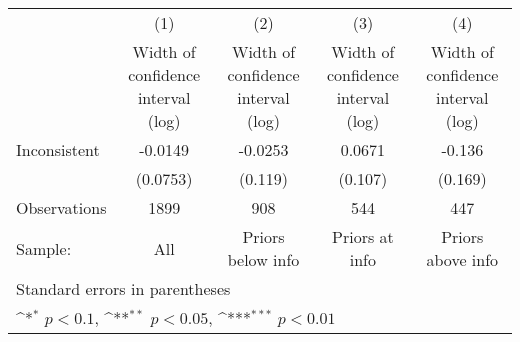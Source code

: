 {
\def\sym#1{\ifmmode^{#1}\else\(^{#1}\)\fi}
\begin{tabular}{l*{4}{c}}
\hline\hline
                    &\multicolumn{1}{c}{(1)}         &\multicolumn{1}{c}{(2)}         &\multicolumn{1}{c}{(3)}         &\multicolumn{1}{c}{(4)}         \\
                    &\shortstack{Width of \\ confidence interval \\ (log)}         &\shortstack{Width of \\ confidence interval \\ (log)}         &\shortstack{Width of \\ confidence interval \\ (log)}         &\shortstack{Width of \\ confidence interval \\ (log)}         \\
\hline
Inconsistent        &     -0.0149         &     -0.0253         &      0.0671         &      -0.136         \\
                    &    (0.0753)         &     (0.119)         &     (0.107)         &     (0.169)         \\
\hline
Observations        &        1899         &         908         &         544         &         447         \\
Sample:             &         All         &Priors below info         &Priors at info         &Priors above info         \\
\hline\hline
\multicolumn{5}{l}{\footnotesize Standard errors in parentheses}\\
\multicolumn{5}{l}{\footnotesize \sym{*} \(p<0.1\), \sym{**} \(p<0.05\), \sym{***} \(p<0.01\)}\\
\end{tabular}
}
